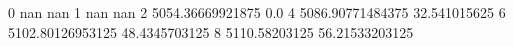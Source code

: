 0 nan nan
1 nan nan
2 5054.36669921875 0.0
4 5086.90771484375 32.541015625
6 5102.80126953125 48.4345703125
8 5110.58203125 56.21533203125
